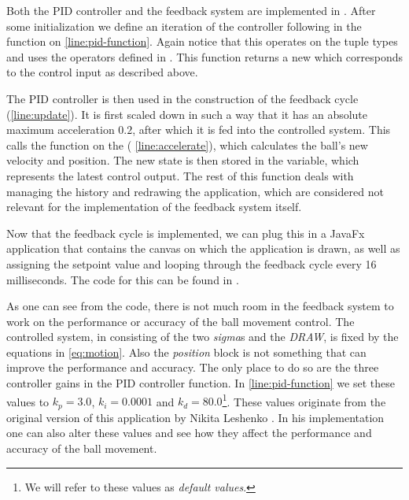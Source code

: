 Both the PID controller and the feedback system are implemented in . After some initialization we define an iteration of the controller following  in the  function on \cref{line:pid-function}. Again notice that this operates on the tuple types and uses the operators defined in . This function returns a new  which corresponds to the control input as described above.

The PID controller is then used in the construction of the feedback cycle (\cref{line:update}). It is first scaled down in such a way that it has an absolute maximum acceleration $0.2$, after which it is fed into the controlled system. This calls the  function on the  ( \cref{line:accelerate}), which calculates the ball's new velocity and position. The new state is then stored in the  variable, which represents the latest control output. The rest of this function deals with managing the history and redrawing the application, which are considered not relevant for the implementation of the feedback system itself.

Now that the feedback cycle is implemented, we can plug this in a JavaFx application that contains the canvas on which the application is drawn, as well as assigning the setpoint value and looping through the feedback cycle every 16 milliseconds. The code for this can be found in .

As one can see from the code, there is not much room in the feedback system to work on the performance or accuracy of the ball movement control. The controlled system, in  consisting of the two \textit{sigma}s and the \textit{DRAW}, is fixed by the equations in \ref{eq:motion}. Also the \textit{position} block is not something that can improve the performance and accuracy. The only place to do so are the three controller gains in the PID controller function. In  \cref{line:pid-function} we set these values to $k_p = 3.0$, $k_i = 0.0001$ and $k_d = 80.0$\footnote{We will refer to these values as \textit{default values}.}. These values originate from the original version of this application by Nikita Leshenko \cite{nikital-balltracker}. In his implementation one can also alter these values and see how they affect the performance and accuracy of the ball movement.


